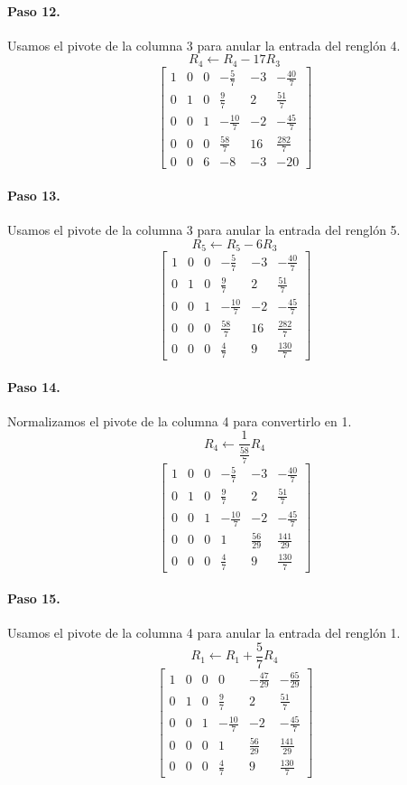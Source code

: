 \documentclass[12pt]{article}
\theoremstyle{remark}
\begin{document}
\paragraph{Paso 12.} Usamos el pivote de la columna 3 para anular la entrada del renglón 4.
\[
R_{4}\leftarrow R_{4}-17R_{3}
\]
\[
\left[\begin{array}{ccccc|c}
1 & 0 & 0 & - \frac{5}{7} & -3 & - \frac{40}{7}\\
0 & 1 & 0 & \frac{9}{7} & 2 & \frac{51}{7}\\
0 & 0 & 1 & - \frac{10}{7} & -2 & - \frac{45}{7}\\
0 & 0 & 0 & \frac{58}{7} & 16 & \frac{282}{7}\\
0 & 0 & 6 & -8 & -3 & -20
\end{array}\right]
\]
\paragraph{Paso 13.} Usamos el pivote de la columna 3 para anular la entrada del renglón 5.
\[
R_{5}\leftarrow R_{5}-6R_{3}
\]
\[
\left[\begin{array}{ccccc|c}
1 & 0 & 0 & - \frac{5}{7} & -3 & - \frac{40}{7}\\
0 & 1 & 0 & \frac{9}{7} & 2 & \frac{51}{7}\\
0 & 0 & 1 & - \frac{10}{7} & -2 & - \frac{45}{7}\\
0 & 0 & 0 & \frac{58}{7} & 16 & \frac{282}{7}\\
0 & 0 & 0 & \frac{4}{7} & 9 & \frac{130}{7}
\end{array}\right]
\]
\paragraph{Paso 14.} Normalizamos el pivote de la columna 4 para convertirlo en 1.
\[
R_{4}\leftarrow \frac{1}{\frac{58}{7}}R_{4}
\]
\[
\left[\begin{array}{ccccc|c}
1 & 0 & 0 & - \frac{5}{7} & -3 & - \frac{40}{7}\\
0 & 1 & 0 & \frac{9}{7} & 2 & \frac{51}{7}\\
0 & 0 & 1 & - \frac{10}{7} & -2 & - \frac{45}{7}\\
0 & 0 & 0 & 1 & \frac{56}{29} & \frac{141}{29}\\
0 & 0 & 0 & \frac{4}{7} & 9 & \frac{130}{7}
\end{array}\right]
\]
\paragraph{Paso 15.} Usamos el pivote de la columna 4 para anular la entrada del renglón 1.
\[
R_{1}\leftarrow R_{1}+\frac{5}{7}R_{4}
\]
\[
\left[\begin{array}{ccccc|c}
1 & 0 & 0 & 0 & - \frac{47}{29} & - \frac{65}{29}\\
0 & 1 & 0 & \frac{9}{7} & 2 & \frac{51}{7}\\
0 & 0 & 1 & - \frac{10}{7} & -2 & - \frac{45}{7}\\
0 & 0 & 0 & 1 & \frac{56}{29} & \frac{141}{29}\\
0 & 0 & 0 & \frac{4}{7} & 9 & \frac{130}{7}
\end{array}\right]
\]
\end{document}
